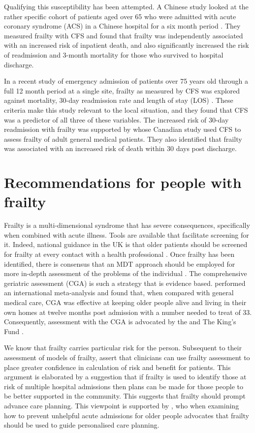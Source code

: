 \documentclass
[
	12pt,
	a4paper,
	oneside,
]{report}
\begin{document}
Qualifying this susceptibility
has been attempted. 
A Chinese study looked at the rather specific cohort of patients aged over 65
who were admitted with acute coronary syndrome (ACS) in a Chinese hospital for 
a six month period \parencite{kang:15}. They measured frailty with CFS and 
found that frailty was independently associated with an increased risk of 
inpatient death, and also significantly increased the risk of readmission and 
3-month mortality for those who survived to hospital discharge.

In a recent study of emergency admission of patients over 
75 years old through a full 12 month period at a single site, frailty as
measured by CFS was explored against mortality, 30-day readmission rate and 
length of stay (LOS)
\parencite{wallis:15}.
These criteria make this study relevant to the local situation, and they found 
that CFS was a predictor of all three of these variables. The increased risk of
30-day readmission with frailty was supported by \textcite{kahlon:15} whose 
Canadian study used CFS to assess frailty of adult general medical patients. 
They also identified that frailty was associated with an increased risk of death
within 30 days post discharge.

\section{Recommendations for people with frailty}

Frailty is a multi-dimensional syndrome that has severe consequences,
specifically when combined with acute illness. Tools are available that facilitate
screening for it. Indeed, national guidance in the UK is that older patients 
should be screened for frailty at every contact with a health professional 
\parencite{bgs:14}. Once frailty has been identified, there is consensus that
an MDT approach should be employed for more in-depth assessment of the 
problems of the individual \parencite{vellas:16}. The comprehensive geriatric
assessment (CGA) is such a strategy that is evidence based. \textcite{ellis:11}
performed an international 
meta-analysis and found that, when compared with general medical care,
CGA was effective at keeping older people alive and living in their own homes at
twelve months post admission with a number needed to treat of 33.
Consequently, assessment with the CGA is advocated by the \textcite{bgs:14}
and The King's Fund \parencite{oliver:14}.

We know that frailty carries particular risk for the person. Subsequent to their
assessment of models of frailty, 
\textcite{martin:08} assert that clinicians can use frailty assessment to place 
greater confidence
in calculation of risk and benefit for patients. This argument is elaborated by 
a suggestion that if frailty is used to identify those at risk of multiple 
hospital admissions then plans can be made for those people to be better
supported in the community. This suggests that frailty should prompt advance care
planning. This viewpoint is supported by 
\textcite{hunt:16}, who when examining how to prevent unhelpful acute admissions
for older people advocates that frailty should be used to guide personalised 
care planning.
\end{document}
